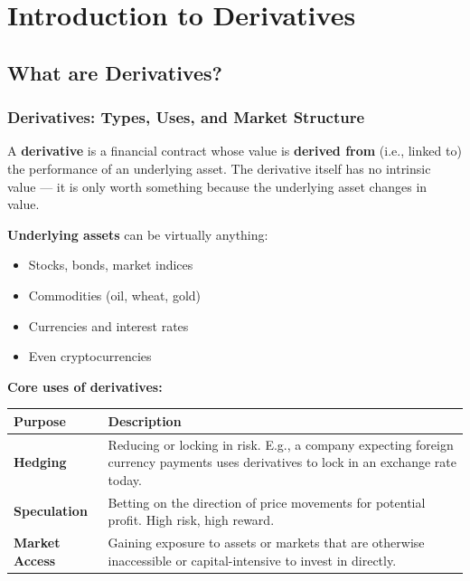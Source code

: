 \documentclass[12pt,openany]{book}
\begin{document}
\chapter{Introduction to Derivatives}
\section{What are Derivatives?}

\subsection{Derivatives: Types, Uses, and Market Structure}

A \textbf{derivative} is a financial contract whose value is \textbf{derived from} (i.e., linked to) the performance of an underlying asset. The derivative itself has no intrinsic value --- it is only worth something because the underlying asset changes in value.

\textbf{Underlying assets} can be virtually anything:
\begin{itemize}[leftmargin=*]
    \item Stocks, bonds, market indices
    \item Commodities (oil, wheat, gold)
    \item Currencies and interest rates
    \item Even cryptocurrencies
\end{itemize}

\textbf{Core uses of derivatives:}

\begin{center}
\small
\renewcommand{\arraystretch}{1.2}
\begin{tabular}{|L{0.26\textwidth}|L{0.64\textwidth}|}
\hline
\textbf{Purpose} & \textbf{Description} \\ \hline
\textbf{Hedging} & Reducing or locking in risk. E.g., a company expecting foreign currency payments uses derivatives to lock in an exchange rate today. \\ \hline
\textbf{Speculation} & Betting on the direction of price movements for potential profit. High risk, high reward. \\ \hline
\textbf{Market Access} & Gaining exposure to assets or markets that are otherwise inaccessible or capital-intensive to invest in directly. \\ \hline
\end{tabular}
\end{center}
\end{document}
